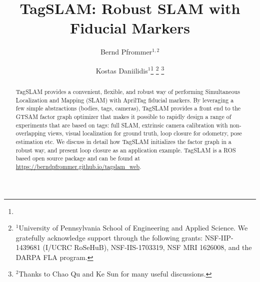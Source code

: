\documentclass[letterpaper, 10 pt, conference]{ieeeconf}
\begin{document}
\title{\LARGE \bf TagSLAM: Robust SLAM with Fiducial Markers}
\author{
Bernd Pfrommer$^{1,2}$\\
\and
Kostas Daniilidis$^{1}$\thanks{}
\thanks{$^{1}$University of Pennsylvania School of Engineering and Applied
Science. We gratefully acknowledge support through the following grants: NSF-IIP-1439681
(I/UCRC RoSeHuB), NSF-IIS-1703319, NSF MRI 1626008, and the DARPA FLA
program.}
\thanks{$^{2}$Thanks to Chao Qu and Ke Sun for many useful discussions.}
}

\maketitle
\begin{abstract}
TagSLAM provides a convenient, flexible, and robust way of performing
Simultaneous Localization and Mapping (SLAM) with AprilTag fiducial
markers. By leveraging a few simple abstractions (bodies, tags,
cameras), TagSLAM provides a front end to the GTSAM factor graph
optimizer that makes it possible to rapidly design a range of
experiments that are based on tags: full SLAM, extrinsic camera
calibration with non-overlapping views, visual localization for ground
truth, loop closure for odometry, pose estimation etc. We discuss in
detail how TagSLAM initializes the factor graph in a robust way, and
present loop closure as an application example.  TagSLAM is a ROS
based open source package and can be found
at \url{https://berndpfrommer.github.io/tagslam_web}.
\end{abstract}







\balance


\end{document}
